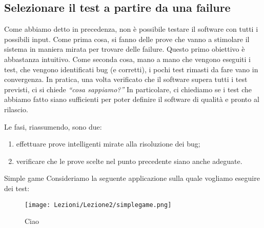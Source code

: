 \subsection{Selezionare il test a partire da una failure}

Come abbiamo detto in precedenza, non è possibile testare il software con tutti i possibili input. Come prima cosa, si fanno delle prove che vanno a stimolare il sistema in maniera mirata per trovare delle failure. Questo primo obiettivo è abbastanza intuitivo. Come seconda cosa, mano a mano che vengono eseguiti i test, che vengono identificati bug (e corretti), i pochi test rimasti da fare vano in convergenza. In pratica, una volta verificato che il software supera tutti i test previsti, ci si chiede \textit{``cosa sappiamo?''} In particolare, ci chiediamo se i test che abbiamo fatto siano sufficienti per poter definire il software di qualità e pronto al rilascio.

Le fasi, riassumendo, sono due: \begin{enumerate}
    \item effettuare prove intelligenti mirate alla risoluzione dei bug;
    \item verificare che le prove scelte nel punto precedente siano anche adeguate.
\end{enumerate}

\begin{example}[]{Simple game}
    Consideriamo la seguente applicazione sulla quale vogliamo eseguire dei test:

    \begin{figure}[H]
        \caption{Ciao}
        \texttt{[image: Lezioni/Lezione2/simplegame.png]}
    \end{figure}
\end{example}